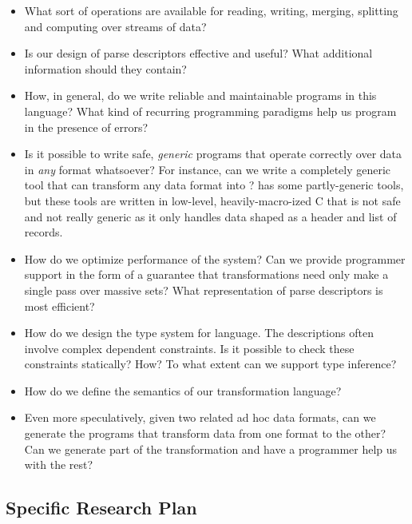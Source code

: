 \documentclass[11pt]{article}
\begin{document}
\begin{itemize}
\item What sort of operations are available for reading, writing,
merging, splitting and computing over streams of data?
\item Is our design of parse descriptors effective and useful?
What additional information should they contain?
\item How, in general, do we write reliable and maintainable
programs in this language? What kind of recurring
programming paradigms help us program in the presence of errors?
\item Is it possible to write safe, {\em generic} programs
that operate correctly over data in {\em any} format whatsoever?
For instance, can we write a completely generic tool that
can transform any data format into \xml?  \pads{} has some
partly-generic tools, but these tools are written in 
low-level, heavily-macro-ized C that is not safe
and not really generic as it only handles data shaped as a header and
list of records.
\item How do we optimize performance of the system?  Can we provide 
programmer support in the form of a guarantee
that transformations need only make a single pass over massive sets?
What representation of parse descriptors is most efficient?
\item How do we design the type system for language.  The descriptions
often involve complex dependent constraints.  Is it possible to check these
constraints statically? How? To what extent can we support type inference?
\item How do we define the semantics of our transformation language?
\item Even more speculatively, given two related ad hoc data formats,
can we generate the programs that transform data from one format to 
the other?  Can we generate part of the transformation and have a programmer
help us with the rest?  
\end{itemize}

\subsection{Specific Research Plan}
\label{sec:plan}
\end{document}
